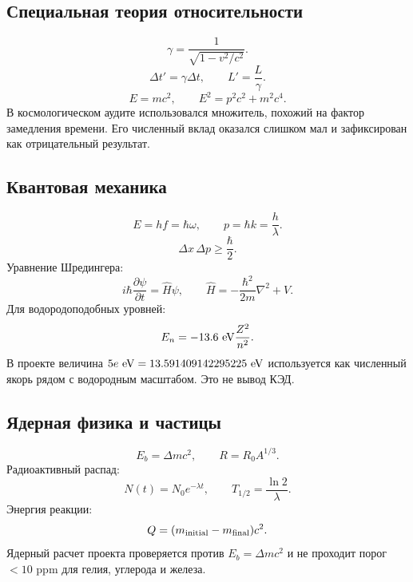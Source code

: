 \documentclass[11pt]{article}
\begin{document}
\subsection{Специальная теория относительности}

\begin{equation}
    \gamma=\frac{1}{\sqrt{1-v^2/c^2}}.
\end{equation}
\begin{equation}
    \Delta t'=\gamma\Delta t,\qquad
    L'=\frac{L}{\gamma}.
\end{equation}
\begin{equation}
    E=mc^2,\qquad
    E^2=p^2c^2+m^2c^4.
\end{equation}
В космологическом аудите использовался множитель, похожий на фактор замедления
времени.  Его численный вклад оказался слишком мал и зафиксирован как
отрицательный результат.

\subsection{Квантовая механика}

\begin{equation}
    E=hf=\hbar\omega,\qquad
    p=\hbar k=\frac{h}{\lambda}.
\end{equation}
\begin{equation}
    \Delta x\,\Delta p\ge\frac{\hbar}{2}.
\end{equation}
Уравнение Шредингера:
\begin{equation}
    i\hbar\frac{\partial\psi}{\partial t}=\hat{H}\psi,
    \qquad
    \hat{H}=-\frac{\hbar^2}{2m}\nabla^2+V.
\end{equation}
Для водородоподобных уровней:
\begin{equation}
    E_n=-13.6~{\rm eV}\frac{Z^2}{n^2}.
\end{equation}
В проекте величина $5e~{\rm eV}=13.591409142295225~{\rm eV}$ используется как
численный якорь рядом с водородным масштабом.  Это не вывод КЭД.

\subsection{Ядерная физика и частицы}

\begin{equation}
    E_b=\Delta mc^2,\qquad
    R=R_0A^{1/3}.
\end{equation}
Радиоактивный распад:
\begin{equation}
    N(t)=N_0e^{-\lambda t},\qquad
    T_{1/2}=\frac{\ln2}{\lambda}.
\end{equation}
Энергия реакции:
\begin{equation}
    Q=(m_{\rm initial}-m_{\rm final})c^2.
\end{equation}
Ядерный расчет проекта проверяется против $E_b=\Delta mc^2$ и не проходит
порог $<10$ ppm для гелия, углерода и железа.
\end{document}
